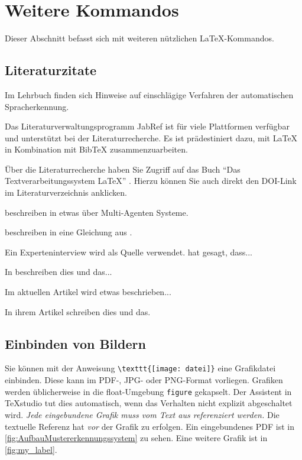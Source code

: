 \section{Weitere Kommandos}
Dieser Abschnitt befasst sich mit weiteren nützlichen \LaTeX-Kommandos.

\subsection{Literaturzitate}
\label{sec:literaturzitate}

Im Lehrbuch \autocite{Schukat-Talamazzini1995}
finden sich Hinweise auf einschlägige Verfahren der automatischen Spracherkennung.

Das Literaturverwaltungsprogramm JabRef \autocite{Kopp2018} ist für viele Plattformen verfügbar und unterstützt bei der Literaturrecherche. Es ist prädestiniert dazu, mit {\LaTeX} in Kombination mit {Bib\TeX} zusammenzuarbeiten.

Über die Literaturrecherche haben Sie Zugriff auf das Buch "`Das Textverarbeitungssystem LaTeX"' \autocite[S. 15]{Oechsner2015}. Hierzu können Sie auch direkt den DOI-Link im Literaturverzeichnis anklicken.

\citeauthor{TyrinMultiAgent2012} beschreiben in \autocite{TyrinMultiAgent2012} etwas über Multi-Agenten Systeme. 

\citeauthor{Ghazali2012} beschreiben in \autocite{Ghazali2012} eine Gleichung aus \autocite{moore2007basic}.

Ein Experteninterview wird als Quelle verwendet. \citeauthor{Interviewpartnerin2021} hat gesagt, dass... \autocite[Aussage-Nr]{Interviewpartnerin2021}

In \autocite{Mamache2022} beschreiben \citeauthor{Mamache2022} dies und das...

Im aktuellen Artikel \autocite{Schaible2023} wird etwas beschrieben...

In ihrem Artikel \autocite[S. 18]{Oechsner2015} schreiben \citeauthor{Oechsner2015} dies und das.


\subsection{Einbinden von Bildern}

Sie können mit der Anweisung \lstinline|\texttt{[image: datei]}| eine Grafikdatei einbinden. Diese kann im PDF-, JPG- oder PNG-Format vorliegen. Grafiken werden üblicherweise in die float-Umgebung \lstinline|figure| gekapselt. Der Assistent in TeXstudio \autocite{vanderZander2018} tut dies automatisch, wenn das Verhalten nicht explizit abgeschaltet wird. \textit{Jede eingebundene Grafik muss vom Text aus referenziert werden.} Die textuelle Referenz hat \textit{vor} der Grafik zu erfolgen. Ein eingebundenes PDF ist in \autoref{fig:AufbauMustererkennungssystem} zu sehen. Eine weitere Grafik ist in \autoref{fig:my_label}.

